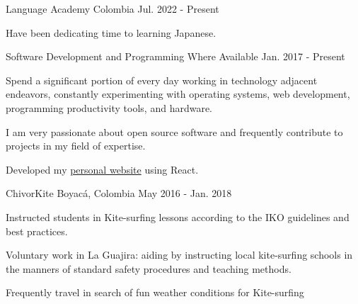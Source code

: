 

\begin{cventries}

	{Language Academy} %
	{Colombia} %
	{Jul. 2022 {-} Present} %
	{
		\begin{cvitems} %
			\item {Have been dedicating time to learning Japanese.}
		\end{cvitems}
	}

	{Software Development and Programming} %
	{Where Available} %
	{Jan. 2017 {-} Present} %
	{
		\begin{cvitems} %
			\item {Spend a significant portion of every day working in technology adjacent endeavors, constantly experimenting with operating systems, web development, programming productivity tools, and hardware.}
			\item {I am very passionate about open source software and frequently contribute to projects in my field of expertise.}
			\item {Developed my \href{https://mantimantilla.github.io/}{personal website} using React.}
		\end{cvitems}
	}

	{ChivorKite} %
	{Boyacá, Colombia} %
	{May 2016 {-} Jan. 2018 } %
	{
		\begin{cvitems} %
			\item {Instructed students in Kite-surfing lessons according to the IKO guidelines and best practices.}
			\item {Voluntary work in La Guajira: aiding by instructing local kite-surfing schools in the manners
			            of standard safety procedures and teaching methods.}
			\item {Frequently travel in search of fun weather conditions for Kite-surfing}
		\end{cvitems}
	}


\end{cventries}
